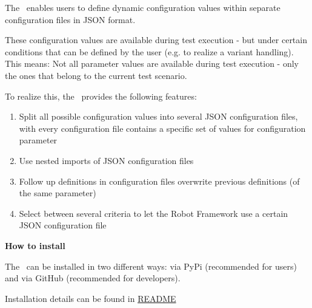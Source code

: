 %



%

The \pkg\ enables users to define dynamic configuration values within separate configuration files in JSON format.

These configuration values are available during test execution - but under certain conditions that can be defined by the user
(e.g. to realize a variant handling). This means: Not all parameter values are available during test execution - only the ones
that belong to the current test scenario.

To realize this, the \pkg\ provides the following features:

\begin{enumerate}
   \item Split all possible configuration values into several JSON configuration files, with every configuration file contains a specific
         set of values for configuration parameter
   \item Use nested imports of JSON configuration files
   \item Follow up definitions in configuration files overwrite previous definitions (of the same parameter)
   \item Select between several criteria to let the Robot Framework use a certain JSON configuration file
\end{enumerate}

\vspace{2ex}

\textbf{How to install}

\vspace{2ex}

The \pkg\ can be installed in two different ways: via PyPi (recommended for users) and via GitHub (recommended for developers).

Installation details can be found in \href{https://github.com/test-fullautomation/robotframework-testsuitesmanagement/blob/develop/README.rst}{README}


